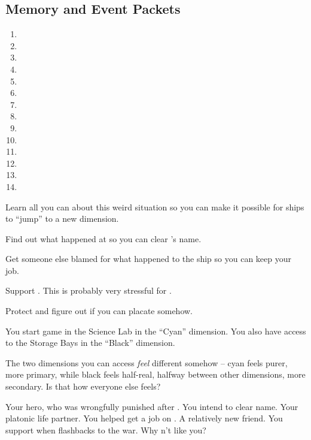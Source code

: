 \documentclass[char]{TMFHope}
\begin{document}
\subsection*{Memory and Event Packets}
\begin{enumerate}
	\item \mPractice{\MYname}
	\item \mNAlpha{\MYname}
	\item \mNavOne{\MYname}
	\item \mNavTwo{\MYname}
	\item \mNavThree{\MYname}
	\item \mNavFour{\MYname}
	\item \mNavFive{\MYname}
	\item \mBroom{\MYname}
	\item \mLab{\MYname}
	\item \mPatient{\MYname}
	\item \mKitchen{\MYname}
	\item \mWeight{\MYname}
	\item \mTheater{\MYname}
	\item \mCrates{\MYname}
\end{enumerate}

\begin{itemz}[Goals]
	\item Learn all you can about this weird situation so you can make it possible for ships to ``jump'' to a new dimension.
	\item Find out what happened at \pBattle{} so you can clear \cCap{}'s name.
	\item Get someone else blamed for what happened to the ship so you can keep your job.
	\item Support \cWeap{}. This is probably very stressful for \cWeap{\them}.
	\item Protect \cBoy{} and figure out if you can placate \cEng{} somehow.
\end{itemz}

\begin{itemz}[Notes]
	\item You start game in the Science Lab in the ``Cyan'' dimension. You also have access to the Storage Bays in the ``Black'' dimension.
	\item The two dimensions you can access {\em feel} different somehow -- cyan feels purer, more primary, while black feels half-real, halfway between other dimensions, more secondary.  Is that how everyone else feels?
\end{itemz}

\begin{contacts}
	\contact{\cCap{}} Your hero, who was wrongfully punished after \pBattle{}. You intend to clear \cCap{\their} name.
	\contact{\cBoy{}} Your platonic life partner. You helped get \cBoy{\them} a job on \pNew{}.
	\contact{\cWeap{}} A relatively new friend. You support \cWeap{\they} when \cWeap{\they} \cWeap{\have} flashbacks to the war.
	\contact{\cEng{}} Why \cEng{\does}n't \cEng{\they} like you?
\end{contacts}
\end{document}
